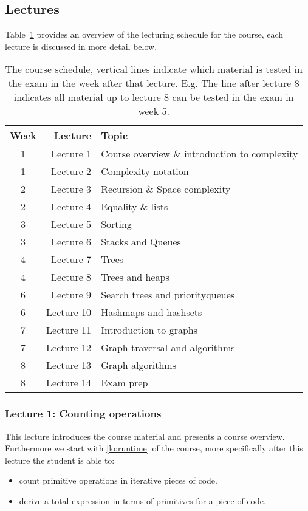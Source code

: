 \subsection{Lectures}
\label{sub:lectures}

Table~\ref{tab:schedule} provides an overview of the lecturing schedule for the course, each lecture is discussed in
more detail below.

\begin{table}[htpb]
	\centering
	\caption{The course schedule, vertical lines indicate which material is tested in the exam in the week after that
	lecture. E.g. The line after lecture 8 indicates all material up to lecture 8 can be tested in the exam in week 5.}
	\label{tab:schedule}
	\begin{tabular}{c | r | l}
		Week & Lecture & Topic \\
		\hline
		1 & Lecture 1 & Course overview \& introduction to complexity\\
		1 & Lecture 2 & Complexity notation \\
		2 & Lecture 3 & Recursion \& Space complexity \\
		2 & Lecture 4 & Equality \& lists \\
		3 & Lecture 5 & Sorting \\
		3 & Lecture 6 & Stacks and Queues\\
		4 & Lecture 7 & Trees \\
		4 & Lecture 8 & Trees and heaps\\
		\hline
		6 & Lecture 9 & Search trees and priorityqueues\\
		6 & Lecture 10 & Hashmaps and hashsets\\
		7 & Lecture 11 & Introduction to graphs\\
		7 & Lecture 12 & Graph traversal and algorithms\\
		8 & Lecture 13 & Graph algorithms\\
		8 & Lecture 14 & Exam prep\\
		\hline
	\end{tabular}
\end{table}

\subsubsection*{Lecture 1: Counting operations}
\label{sub:lecture_1}

This lecture introduces the course material and presents a course overview. Furthermore we start with \cref{lo:runtime}
of the course, more specifically after this lecture the student is able to:
\begin{itemize}
	\item count primitive operations in iterative pieces of code.
	\item derive a total expression in terms of primitives for a piece of code.
\end{itemize}

